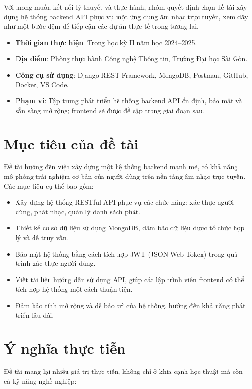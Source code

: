 Với mong muốn kết nối lý thuyết và thực hành, nhóm quyết định chọn đề tài xây dựng hệ thống backend API phục vụ một ứng dụng âm nhạc trực tuyến, xem đây như một bước đệm để tiếp cận các dự án thực tế trong tương lai.

\begin{itemize}
    \item \textbf{Thời gian thực hiện}: Trong học kỳ II năm học 2024–2025.
    \item \textbf{Địa điểm}: Phòng thực hành Công nghệ Thông tin, Trường Đại học Sài Gòn.
    \item \textbf{Công cụ sử dụng}: Django REST Framework, MongoDB, Postman, GitHub, Docker, VS Code.
    \item \textbf{Phạm vi}: Tập trung phát triển hệ thống backend API ổn định, bảo mật và sẵn sàng mở rộng; frontend sẽ được đề cập trong giai đoạn sau.
\end{itemize}

\section{Mục tiêu của đề tài}

Đề tài hướng đến việc xây dựng một hệ thống backend mạnh mẽ, có khả năng mô phỏng trải nghiệm cơ bản của người dùng trên nền tảng âm nhạc trực tuyến. Các mục tiêu cụ thể bao gồm:

\begin{itemize}
    \item Xây dựng hệ thống RESTful API phục vụ các chức năng: xác thực người dùng, phát nhạc, quản lý danh sách phát.
    \item Thiết kế cơ sở dữ liệu sử dụng MongoDB, đảm bảo dữ liệu được tổ chức hợp lý và dễ truy vấn.
    \item Bảo mật hệ thống bằng cách tích hợp JWT (JSON Web Token) trong quá trình xác thực người dùng.
    \item Viết tài liệu hướng dẫn sử dụng API, giúp các lập trình viên frontend có thể tích hợp hệ thống một cách thuận tiện.
    \item Đảm bảo tính mở rộng và dễ bảo trì của hệ thống, hướng đến khả năng phát triển lâu dài.
\end{itemize}

\section{Ý nghĩa thực tiễn}

Đề tài mang lại nhiều giá trị thực tiễn, không chỉ ở khía cạnh học thuật mà còn cả kỹ năng nghề nghiệp:

